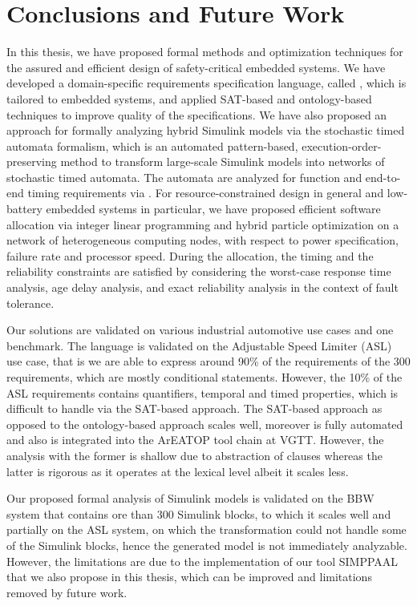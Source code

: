 \chapter{Conclusions and Future Work}
In this thesis, we have proposed formal methods and optimization techniques for the assured and efficient design of safety-critical embedded systems. We have developed a domain-specific requirements specification language, called \resa, which is tailored to embedded systems, and applied SAT-based and ontology-based techniques to improve quality of the specifications. We have also proposed an approach for formally analyzing hybrid Simulink models via the stochastic timed automata formalism, which is an automated pattern-based, execution-order-preserving method to transform large-scale Simulink models into networks of stochastic timed automata. The automata are analyzed for function and end-to-end timing requirements via \uppaalsmc. For resource-constrained design in general and low-battery embedded systems in particular, we have proposed efficient software allocation via integer linear programming and hybrid particle optimization on a network of heterogeneous computing nodes, with respect to power specification, failure rate and processor speed. During the allocation, the timing and the reliability constraints are satisfied by considering the worst-case response time analysis, age delay analysis, and exact reliability analysis in the context of fault tolerance.

Our solutions are validated on various industrial automotive use cases and one benchmark. The \resa{} language is validated on the Adjustable Speed Limiter (ASL) use case, that is we are able to express around 90\% of the requirements of the 300 requirements, which are mostly conditional statements. However, the 10\% of the ASL requirements contains quantifiers, temporal and timed properties, which is difficult to handle via the SAT-based approach. The SAT-based approach as opposed to the ontology-based approach scales well, moreover is fully automated and also is integrated into the ArEATOP tool chain at VGTT. However, the analysis with the former is shallow due to abstraction of clauses whereas the latter is rigorous as it operates at the lexical level albeit it scales less. 

Our proposed formal analysis of Simulink models is validated on the BBW system that contains ore than 300 Simulink blocks, to which it scales well and partially on the ASL system, on which the transformation could not handle some of the Simulink blocks, hence the generated model is not immediately analyzable.  However, the limitations are due to the implementation of our tool SIMPPAAL that we also propose in this thesis, which can be improved and limitations removed by future work. 

